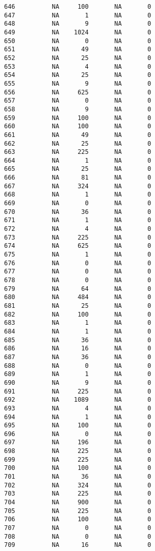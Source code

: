 \documentclass[
  letterpaper,
  DIV=11,
  numbers=noendperiod]{scrreprt}
\begin{document}
\begin{verbatim}
646          NA     100       NA       0
647          NA       1       NA       0
648          NA       9       NA       0
649          NA    1024       NA       0
650          NA       0       NA       0
651          NA      49       NA       0
652          NA      25       NA       0
653          NA       4       NA       0
654          NA      25       NA       0
655          NA       9       NA       0
656          NA     625       NA       0
657          NA       0       NA       0
658          NA       9       NA       0
659          NA     100       NA       0
660          NA     100       NA       0
661          NA      49       NA       0
662          NA      25       NA       0
663          NA     225       NA       0
664          NA       1       NA       0
665          NA      25       NA       0
666          NA      81       NA       0
667          NA     324       NA       0
668          NA       1       NA       0
669          NA       0       NA       0
670          NA      36       NA       0
671          NA       1       NA       0
672          NA       4       NA       0
673          NA     225       NA       0
674          NA     625       NA       0
675          NA       1       NA       0
676          NA       0       NA       0
677          NA       0       NA       0
678          NA       0       NA       0
679          NA      64       NA       0
680          NA     484       NA       0
681          NA      25       NA       0
682          NA     100       NA       0
683          NA       1       NA       0
684          NA       1       NA       0
685          NA      36       NA       0
686          NA      16       NA       0
687          NA      36       NA       0
688          NA       0       NA       0
689          NA       1       NA       0
690          NA       9       NA       0
691          NA     225       NA       0
692          NA    1089       NA       0
693          NA       4       NA       0
694          NA       1       NA       0
695          NA     100       NA       0
696          NA       0       NA       0
697          NA     196       NA       0
698          NA     225       NA       0
699          NA     225       NA       0
700          NA     100       NA       0
701          NA      36       NA       0
702          NA     324       NA       0
703          NA     225       NA       0
704          NA     900       NA       0
705          NA     225       NA       0
706          NA     100       NA       0
707          NA       0       NA       0
708          NA       0       NA       0
709          NA      16       NA       0

\end{verbatim}
\end{document}

